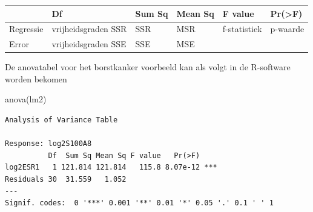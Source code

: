 \documentclass[
  dutch,
  letterpaper,
  12pt]{book}
\newenvironment{Shaded}{\begin{snugshade}}{\end{snugshade}}
\newcommand{\FunctionTok}[1]{\textcolor[rgb]{0.28,0.35,0.67}{#1}}
\newcommand{\NormalTok}[1]{\textcolor[rgb]{0.00,0.23,0.31}{#1}}
\newcounter{none} %
\theoremstyle{definition}
\theoremstyle{definition}
\theoremstyle{definition}
\theoremstyle{remark}
\begin{document}
{\def\LTcaptype{none} %
\begin{longtable}[]{@{}
  >{\raggedright\arraybackslash}p{}
  >{\raggedright\arraybackslash}p{}
  >{\raggedright\arraybackslash}p{}
  >{\raggedright\arraybackslash}p{}
  >{\raggedright\arraybackslash}p{}
  >{\raggedright\arraybackslash}p{}@{}}
\toprule\noalign{}
\begin{minipage}[b]{\linewidth}\raggedright
\end{minipage} & \begin{minipage}[b]{\linewidth}\raggedright
Df
\end{minipage} & \begin{minipage}[b]{\linewidth}\raggedright
Sum Sq
\end{minipage} & \begin{minipage}[b]{\linewidth}\raggedright
Mean Sq
\end{minipage} & \begin{minipage}[b]{\linewidth}\raggedright
F value
\end{minipage} & \begin{minipage}[b]{\linewidth}\raggedright
Pr(\textgreater F)
\end{minipage} \\
\midrule\noalign{}
\endhead
\bottomrule\noalign{}
\endlastfoot
Regressie & vrijheidsgraden SSR & SSR & MSR & f-statistiek & p-waarde \\
Error & vrijheidsgraden SSE & SSE & MSE & & \\
\end{longtable}
}

De anovatabel voor het borstkanker voorbeeld kan als volgt in de
R-software worden bekomen

\begin{Shaded}
\begin{Highlighting}[]
\FunctionTok{anova}\NormalTok{(lm2)}
\end{Highlighting}
\end{Shaded}

\begin{verbatim}
Analysis of Variance Table

Response: log2S100A8
          Df  Sum Sq Mean Sq F value   Pr(>F)    
log2ESR1   1 121.814 121.814   115.8 8.07e-12 ***
Residuals 30  31.559   1.052                     
---
Signif. codes:  0 '***' 0.001 '**' 0.01 '*' 0.05 '.' 0.1 ' ' 1
\end{verbatim}
\end{document}
